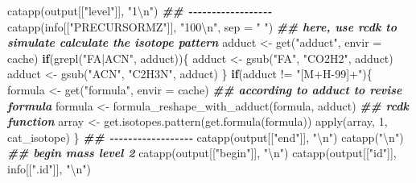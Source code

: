 \documentclass[
]{article}
\newenvironment{Shaded}{\begin{snugshade}}{\end{snugshade}}
\newcommand{\AttributeTok}[1]{\textcolor[rgb]{0.77,0.63,0.00}{#1}}
\newcommand{\ControlFlowTok}[1]{\textcolor[rgb]{0.13,0.29,0.53}{\textbf{#1}}}
\newcommand{\DecValTok}[1]{\textcolor[rgb]{0.00,0.00,0.81}{#1}}
\newcommand{\DocumentationTok}[1]{\textcolor[rgb]{0.56,0.35,0.01}{\textbf{\textit{#1}}}}
\newcommand{\FunctionTok}[1]{\textcolor[rgb]{0.00,0.00,0.00}{#1}}
\newcommand{\NormalTok}[1]{#1}
\newcommand{\OtherTok}[1]{\textcolor[rgb]{0.56,0.35,0.01}{#1}}
\newcommand{\SpecialCharTok}[1]{\textcolor[rgb]{0.00,0.00,0.00}{#1}}
\newcommand{\StringTok}[1]{\textcolor[rgb]{0.31,0.60,0.02}{#1}}
\begin{document}
\begin{Shaded}
\begin{Highlighting}[]
        \FunctionTok{catapp}\NormalTok{(output[[}\StringTok{"level"}\NormalTok{]], }\StringTok{"1}\SpecialCharTok{\textbackslash{}n}\StringTok{"}\NormalTok{)}
        \DocumentationTok{\#\# {-}{-}{-}{-}{-}{-}{-}{-}{-}{-}{-}{-}{-}{-}{-}{-}{-}{-} }
        \FunctionTok{catapp}\NormalTok{(info[[}\StringTok{"PRECURSORMZ"}\NormalTok{]], }\StringTok{"100}\SpecialCharTok{\textbackslash{}n}\StringTok{"}\NormalTok{, }\AttributeTok{sep =} \StringTok{" "}\NormalTok{)}
        \DocumentationTok{\#\# here, use rcdk to simulate calculate the isotope pattern}
\NormalTok{        adduct }\OtherTok{\textless{}{-}} \FunctionTok{get}\NormalTok{(}\StringTok{"adduct"}\NormalTok{, }\AttributeTok{envir =}\NormalTok{ cache)}
        \ControlFlowTok{if}\NormalTok{(}\FunctionTok{grepl}\NormalTok{(}\StringTok{"FA|ACN"}\NormalTok{, adduct))\{}
\NormalTok{          adduct }\OtherTok{\textless{}{-}} \FunctionTok{gsub}\NormalTok{(}\StringTok{"FA"}\NormalTok{, }\StringTok{"CO2H2"}\NormalTok{, adduct)}
\NormalTok{          adduct }\OtherTok{\textless{}{-}} \FunctionTok{gsub}\NormalTok{(}\StringTok{"ACN"}\NormalTok{, }\StringTok{"C2H3N"}\NormalTok{, adduct)}
\NormalTok{        \}}
        \ControlFlowTok{if}\NormalTok{(adduct }\SpecialCharTok{!=} \StringTok{"[M+H{-}99]+"}\NormalTok{)\{}
\NormalTok{          formula }\OtherTok{\textless{}{-}} \FunctionTok{get}\NormalTok{(}\StringTok{"formula"}\NormalTok{, }\AttributeTok{envir =}\NormalTok{ cache)}
          \DocumentationTok{\#\# according to adduct to revise formula}
\NormalTok{          formula }\OtherTok{\textless{}{-}} \FunctionTok{formula\_reshape\_with\_adduct}\NormalTok{(formula, adduct)}
          \DocumentationTok{\#\# rcdk function}
\NormalTok{          array }\OtherTok{\textless{}{-}} \FunctionTok{get.isotopes.pattern}\NormalTok{(}\FunctionTok{get.formula}\NormalTok{(formula))}
          \FunctionTok{apply}\NormalTok{(array, }\DecValTok{1}\NormalTok{, cat\_isotope)}
\NormalTok{        \}}
        \DocumentationTok{\#\# {-}{-}{-}{-}{-}{-}{-}{-}{-}{-}{-}{-}{-}{-}{-}{-}{-}{-} }
        \FunctionTok{catapp}\NormalTok{(output[[}\StringTok{"end"}\NormalTok{]], }\StringTok{"}\SpecialCharTok{\textbackslash{}n}\StringTok{"}\NormalTok{)}
        \FunctionTok{catapp}\NormalTok{(}\StringTok{"}\SpecialCharTok{\textbackslash{}n}\StringTok{"}\NormalTok{)}
        \DocumentationTok{\#\# begin mass level 2}
        \FunctionTok{catapp}\NormalTok{(output[[}\StringTok{"begin"}\NormalTok{]], }\StringTok{"}\SpecialCharTok{\textbackslash{}n}\StringTok{"}\NormalTok{)}
        \FunctionTok{catapp}\NormalTok{(output[[}\StringTok{"id"}\NormalTok{]], info[[}\StringTok{".id"}\NormalTok{]], }\StringTok{"}\SpecialCharTok{\textbackslash{}n}\StringTok{"}\NormalTok{)}

\end{Highlighting}
\end{Shaded}
\end{document}
